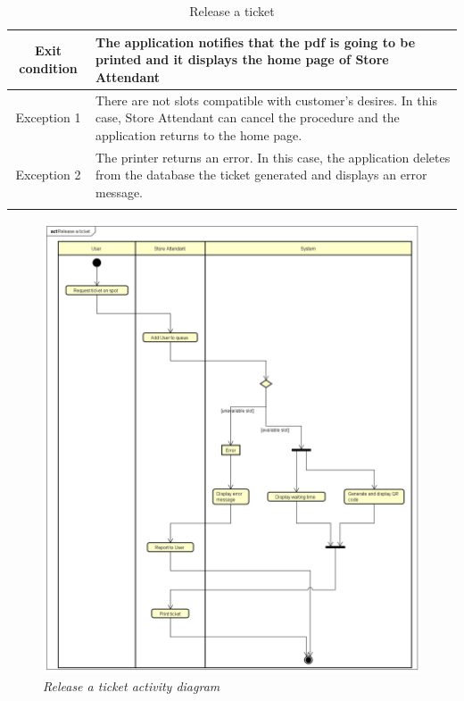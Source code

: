 \documentclass[table, 12pt]{article}
\begin{document}
\begin{longtable}{|c| p{10cm}|}
    \hline
    Exit condition   & The application notifies that the pdf is going to be printed and it displays the home page of Store Attendant
    \\
    \hline
    \hline
    Exception 1      & There are not slots compatible with customer's desires. In this case, Store Attendant can cancel the procedure and the application returns to the home page. \\
    \hline
    Exception 2      & The printer returns an error. In this case, the application deletes from the database the ticket generated and displays an error message.                    \\
    \hline
    \caption{Release a ticket}                                                                                                                                                      \\
\end{longtable}

\begin{figure}[H]
    \centering
    \includegraphics[scale=0.45]{assets/Activity-Diagrams/act_release.png}
    \caption{\textit{Release a ticket activity diagram}}
\end{figure}
\end{document}
